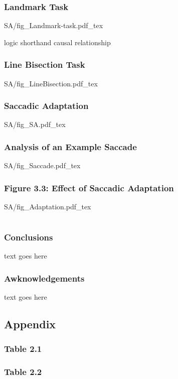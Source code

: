 \documentclass{beamer}
\begin{document}
\begin{frame}
	\frametitle{Landmark Task}
	\def\svgwidth{0.8\textwidth}
	{SA/fig_Landmark-task.pdf_tex}
\end{frame}


\begin{frame}logic shorthand causal relationship
	\frametitle{Line Bisection Task}
	\def\svgwidth{0.9\textwidth}
	{SA/fig_LineBisection.pdf_tex}
\end{frame}

\begin{frame}
	\frametitle{Saccadic Adaptation}
	\centering
	\def\svgwidth{0.7\textwidth}
	\tiny
	{SA/fig_SA.pdf_tex}
\end{frame}


\begin{frame}
	\frametitle{Analysis of an Example Saccade}
	\centering
	\def\svgwidth{\textwidth}
	\tiny
	{SA/fig_Saccade.pdf_tex}
\end{frame}

\begin{frame}
	\frametitle{Figure 3.3: Effect of Saccadic Adaptation}
	\centering
	\def\svgwidth{0.9\textwidth}
	\tiny
	{SA/fig_Adaptation.pdf_tex}
\end{frame}


\section*{}
\begin{frame}
	\frametitle{Conclusions}
	text goes here
\end{frame}

\begin{frame}
	\frametitle{Awknowledgements}
	text goes here
\end{frame}


\subsection*{Appendix}
\begin{frame}
	\frametitle{Table 2.1}
\end{frame}

\begin{frame}
	\frametitle{Table 2.2}
	
\end{frame}
\end{document}
